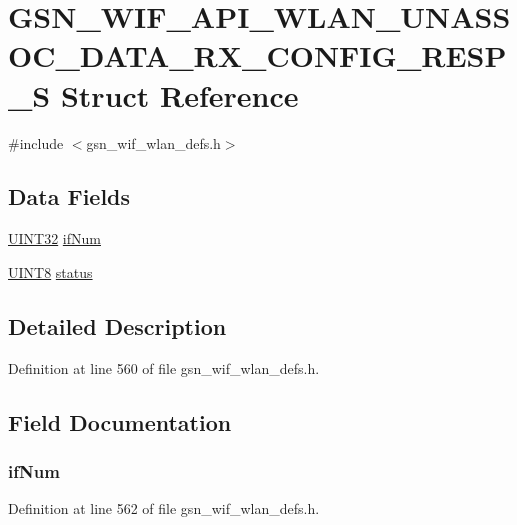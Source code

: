\hypertarget{a00307}{
\section{GSN\_\-WIF\_\-API\_\-WLAN\_\-UNASSOC\_\-DATA\_\-RX\_\-CONFIG\_\-RESP\_\-S Struct Reference}
\label{a00307}
}


{\ttfamily \#include $<$gsn\_\-wif\_\-wlan\_\-defs.h$>$}

\subsection*{Data Fields}
\begin{DoxyCompactItemize}
\item 
\hyperlink{a00660_gae1e6edbbc26d6fbc71a90190d0266018}{UINT32} \hyperlink{a00307_ab582fd779b13f74e06e2491389a60aa0}{ifNum}
\item 
\hyperlink{a00660_gab27e9918b538ce9d8ca692479b375b6a}{UINT8} \hyperlink{a00307_ac4f6d5d1544a8d2c1309479ffe1b61ab}{status}
\end{DoxyCompactItemize}


\subsection{Detailed Description}


Definition at line 560 of file gsn\_\-wif\_\-wlan\_\-defs.h.



\subsection{Field Documentation}
\hypertarget{a00307_ab582fd779b13f74e06e2491389a60aa0}{
\subsubsection[{ifNum}]{ {\bf ifNum}}}
\label{a00307_ab582fd779b13f74e06e2491389a60aa0}


Definition at line 562 of file gsn\_\-wif\_\-wlan\_\-defs.h.

